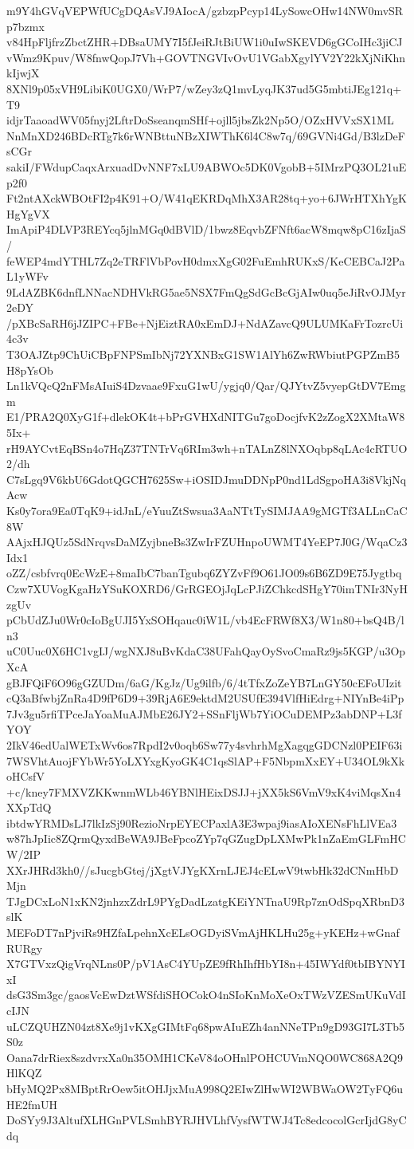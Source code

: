 m9Y4hGVqVEPWfUCgDQAsVJ9AIocA/gzbzpPcyp14LySowcOHw14NW0mvSRp7bzmx
v84HpFljfrzZbctZHR+DBsaUMY7I5fJeiRJtBiUW1i0uIwSKEVD6gGCoIHc3jiCJ
vWmz9Kpuv/W8fnwQopJ7Vh+GOVTNGVIvOvU1VGabXgylYV2Y22kXjNiKhnkIjwjX
8XNl9p05xVH9LibiK0UGX0/WrP7/wZey3zQ1mvLyqJK37ud5G5mbtiJEg121q+T9
idjrTaaoadWV05fnyj2LftrDoSseanqmSHf+ojll5jbsZk2Np5O/OZxHVVxSX1ML
NnMnXD246BDcRTg7k6rWNBttuNBzXIWThK6l4C8w7q/69GVNi4Gd/B3lzDeFsCGr
sakiI/FWdupCaqxArxuadDvNNF7xLU9ABWOc5DK0VgobB+5IMrzPQ3OL21uEp2f0
Ft2ntAXckWBOtFI2p4K91+O/W41qEKRDqMhX3AR28tq+yo+6JWrHTXhYgKHgYgVX
ImApiP4DLVP3REYcq5jlnMGq0dBVlD/1bwz8EqvbZFNft6acW8mqw8pC16zIjaS/
feWEP4mdYTHL7Zq2eTRFlVbPovH0dmxXgG02FuEmhRUKxS/KeCEBCaJ2PaL1yWFv
9LdAZBK6dnfLNNacNDHVkRG5ae5NSX7FmQgSdGcBcGjAIw0uq5eJiRvOJMyr2eDY
/pXBcSaRH6jJZIPC+FBe+NjEiztRA0xEmDJ+NdAZavcQ9ULUMKaFrTozrcUi4c3v
T3OAJZtp9ChUiCBpFNPSmIbNj72YXNBxG1SW1AlYh6ZwRWbiutPGPZmB5H8pYsOb
Ln1kVQcQ2nFMsAIuiS4Dzvaae9FxuG1wU/ygjq0/Qar/QJYtvZ5vyepGtDV7Emgm
E1/PRA2Q0XyG1f+dlekOK4t+bPrGVHXdNITGu7goDocjfvK2zZogX2XMtaW85Ix+
rH9AYCvtEqBSn4o7HqZ37TNTrVq6RIm3wh+nTALnZ8lNXOqbp8qLAc4cRTUO2/dh
C7sLgq9V6kbU6GdotQGCH7625Sw+iOSIDJmuDDNpP0nd1LdSgpoHA3i8VkjNqAcw
Ks0y7ora9Ea0TqK9+idJnL/eYuuZtSwsua3AaNTtTySIMJAA9gMGTf3ALLnCaC8W
AAjxHJQUz5SdNrqvsDaMZyjbneBs3ZwIrFZUHnpoUWMT4YeEP7J0G/WqaCz3Idx1
oZZ/csbfvrq0EcWzE+8maIbC7banTgubq6ZYZvFf9O61JO09s6B6ZD9E75Jygtbq
Czw7XUVogKgaHzYSuKOXRD6/GrRGEOjJqLcPJiZChkcdSHgY70imTNIr3NyHzgUv
pCbUdZJu0Wr0cIoBgUJI5YxSOHqauc0iW1L/vb4EcFRWf8X3/W1n80+bsQ4B/ln3
uC0Uuc0X6HC1vgIJ/wgNXJ8uBvKdaC38UFahQayOySvoCmaRz9js5KGP/u3OpXcA
gBJFQiF6O96gGZUDm/6aG/KgJz/Ug9ilfb/6/4tTfxZoZeYB7LnGY50cEFoUIzit
cQ3aBfwbjZnRa4D9fP6D9+39RjA6E9ektdM2USUfE394VlfHiEdrg+NIYnBe4iPp
7Jv3gu5rfiTPceJaYoaMuAJMbE26JY2+SSnFljWb7YiOCuDEMPz3abDNP+L3fYOY
2IkV46edUalWETxWv6os7RpdI2v0oqb6Sw77y4svhrhMgXagqgGDCNzl0PEIF63i
7WSVhtAuojFYbWr5YoLXYxgKyoGK4C1qsSlAP+F5NbpmXxEY+U34OL9kXkoHCsfV
+c/kney7FMXVZKKwnmWLb46YBNlHEixDSJJ+jXX5kS6VmV9xK4viMqsXn4XXpTdQ
ibtdwYRMDsLJ7lkIzSj90RezioNrpEYECPaxlA3E3wpaj9iasAIoXENsFhLlVEa3
w87hJpIic8ZQrmQyxdBeWA9JBeFpcoZYp7qGZugDpLXMwPk1nZaEmGLFmHCW/2IP
XXrJHRd3kh0//sJucgbGtej/jXgtVJYgKXrnLJEJ4cELwV9twbHk32dCNmHbDMjn
TJgDCxLoN1xKN2jnhzxZdrL9PYgDadLzatgKEiYNTnaU9Rp7znOdSpqXRbnD3slK
MEFoDT7nPjviRs9HZfaLpehnXcELsOGDyiSVmAjHKLHu25g+yKEHz+wGnafRURgy
X7GTVxzQigVrqNLns0P/pV1AsC4YUpZE9fRhIhfHbYI8n+45IWYdf0tbIBYNYIxI
dsG3Sm3gc/gaosVcEwDztWSfdiSHOCokO4nSIoKnMoXeOxTWzVZESmUKuVdIcIJN
uLCZQUHZN04zt8Xe9j1vKXgGIMtFq68pwAIuEZh4anNNeTPn9gD93GI7L3Tb5S0z
Oana7drRiex8szdvrxXa0n35OMH1CKeV84oOHnlPOHCUVmNQO0WC868A2Q9HlKQZ
bHyMQ2Px8MBptRrOew5itOHJjxMuA998Q2EIwZlHwWI2WBWaOW2TyFQ6uHE2fmUH
DoSYy9J3AltufXLHGnPVLSmhBYRJHVLhfVysfWTWJ4Tc8edcocolGcrIjdG8yCdq
